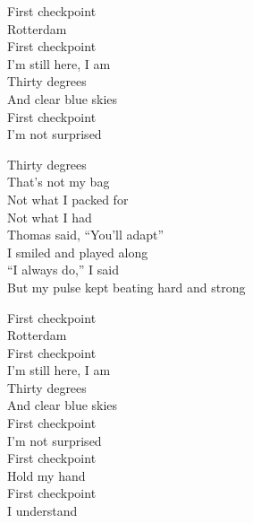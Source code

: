 \begin{lyrics}
First checkpoint\\
Rotterdam\\
First checkpoint\\
I’m still here, I am\\
Thirty degrees\\
And clear blue skies\\
First checkpoint\\
I’m not surprised

Thirty degrees\\
That’s not my bag\\
Not what I packed for\\
Not what I had\\
Thomas said, “You’ll adapt”\\
I smiled and played along\\
“I always do,” I said\\
But my pulse kept beating hard and strong

First checkpoint\\
Rotterdam\\
First checkpoint\\
I’m still here, I am\\
Thirty degrees\\
And clear blue skies\\
First checkpoint\\
I’m not surprised\\
First checkpoint\\
Hold my hand\\
First checkpoint\\
I understand
\end{lyrics}

